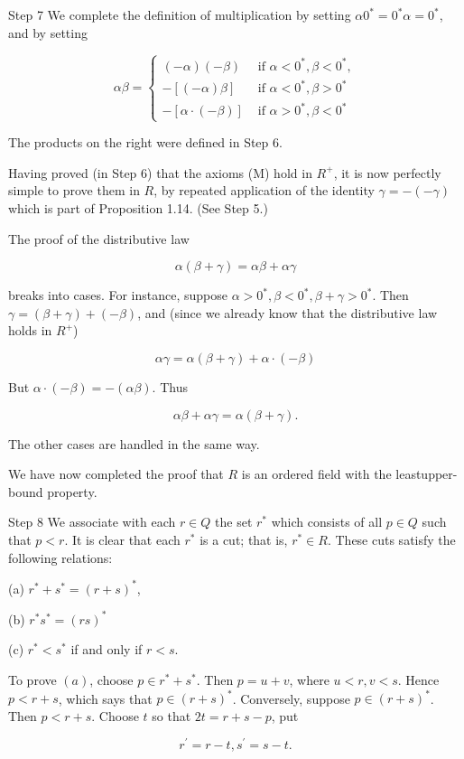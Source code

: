\documentclass[10pt]{article}
\begin{document}
Step 7 We complete the definition of multiplication by setting $\alpha 0^{*}=0^{*} \alpha=0^{*}$, and by setting

$$
\alpha \beta= \begin{cases}(-\alpha)(-\beta) & \text { if } \alpha<0^{*}, \beta<0^{*}, \\ -[(-\alpha) \beta] & \text { if } \alpha<0^{*}, \beta>0^{*} \\ -[\alpha \cdot(-\beta)] & \text { if } \alpha>0^{*}, \beta<0^{*}\end{cases}
$$

The products on the right were defined in Step 6.

Having proved (in Step 6) that the axioms (M) hold in $R^{+}$, it is now perfectly simple to prove them in $R$, by repeated application of the identity $\gamma=-(-\gamma)$ which is part of Proposition 1.14. (See Step 5.)

The proof of the distributive law

$$
\alpha(\beta+\gamma)=\alpha \beta+\alpha \gamma
$$

breaks into cases. For instance, suppose $\alpha>0^{*}, \beta<0^{*}, \beta+\gamma>0^{*}$. Then $\gamma=(\beta+\gamma)+(-\beta)$, and (since we already know that the distributive law holds in $R^{+}$)

$$
\alpha \gamma=\alpha(\beta+\gamma)+\alpha \cdot(-\beta)
$$

But $\alpha \cdot(-\beta)=-(\alpha \beta)$. Thus

$$
\alpha \beta+\alpha \gamma=\alpha(\beta+\gamma) .
$$

The other cases are handled in the same way.

We have now completed the proof that $R$ is an ordered field with the leastupper-bound property.

Step 8 We associate with each $r \in Q$ the set $r^{*}$ which consists of all $p \in Q$ such that $p<r$. It is clear that each $r^{*}$ is a cut; that is, $r^{*} \in R$. These cuts satisfy the following relations:

(a) $r^{*}+s^{*}=(r+s)^{*}$,

(b) $r^{*} s^{*}=(r s)^{*}$

(c) $r^{*}<s^{*}$ if and only if $r<s$.

To prove $(a)$, choose $p \in r^{*}+s^{*}$. Then $p=u+v$, where $u<r, v<s$. Hence $p<r+s$, which says that $p \in(r+s)^{*}$. Conversely, suppose $p \in(r+s)^{*}$. Then $p<r+s$. Choose $t$ so that $2 t=r+s-p$, put

$$
r^{\prime}=r-t, s^{\prime}=s-t .
$$
\end{document}
